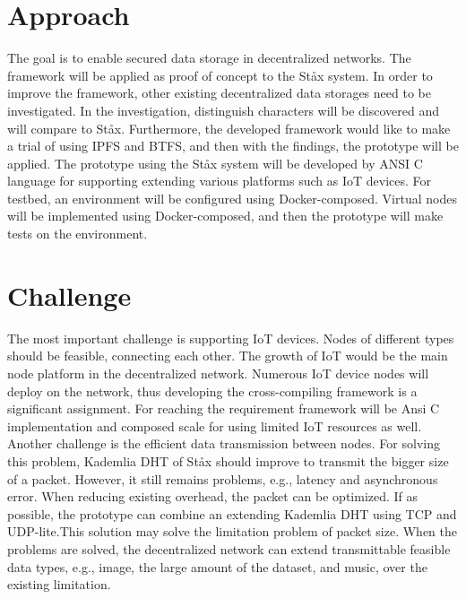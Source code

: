 \documentclass{article}
\begin{document}
\section{Approach}

The goal is to enable secured data storage in decentralized networks. The framework will be applied as proof of concept to the St\aa x system. In order to improve the framework, other existing decentralized data storages need to be investigated. In the investigation, distinguish characters will be discovered and will compare to St\aa x. Furthermore, the developed framework would like to make a trial of using IPFS and BTFS, and then with the findings, the prototype will be applied. The prototype using the St\aa x system will be developed by ANSI C language for supporting extending various platforms such as IoT devices. For testbed, an environment will be configured using Docker-composed. Virtual nodes will be implemented using Docker-composed, and then the prototype will make tests on the environment.

\section{Challenge}
The most important challenge is supporting IoT devices. Nodes of different types should be feasible, connecting each other. The growth of IoT would be the main node platform in the decentralized network. Numerous IoT device nodes will deploy on the network, thus developing the cross-compiling framework is a significant assignment. For reaching the requirement framework will be Ansi C implementation and composed scale for using limited IoT resources as well. Another challenge is the efficient data transmission between nodes. For solving this problem, Kademlia DHT of St\aa x should improve to transmit the bigger size of a packet. However, it still remains problems, e.g., latency and asynchronous error. When reducing existing overhead, the packet can be optimized. If as possible, the prototype can combine an extending Kademlia DHT using TCP and UDP-lite\cite{rfc3828}.This solution may solve the limitation problem of packet size. When the problems are solved, the decentralized network can extend transmittable feasible data types, e.g., image, the large amount of the dataset, and music, over the existing limitation.
\end{document}
